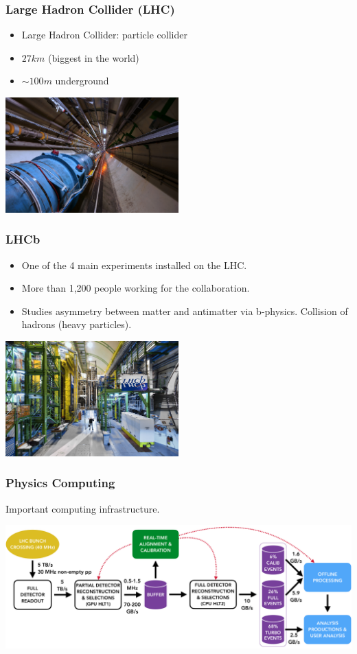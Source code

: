 \documentclass{beamer}
\begin{document}
\begin{frame}
    \frametitle{Large Hadron Collider (LHC)}

    \begin{itemize}
        \item Large Hadron Collider: particle collider
        \item $ 27 km $ (biggest in the world)
        \item $ \sim 100 m $ underground
    \end{itemize}

    \includegraphics[width=0.5\textwidth]{LHC.jpg}
\end{frame}

\begin{frame}
    \frametitle{LHCb}

    \begin{itemize}
        \item One of the 4 main experiments installed on the LHC.
        \item More than 1,200 people working for the collaboration.
        \item Studies asymmetry between matter and antimatter via b-physics.
              Collision of hadrons (heavy particles).
    \end{itemize}

    \includegraphics[width=0.5\textwidth]{LHCb.jpg}
\end{frame}

\begin{frame}
    \frametitle{Physics Computing}

    Important computing infrastructure.

    \includegraphics[width=\textwidth]{LHCb_stack.png}
\end{frame}
\end{document}
